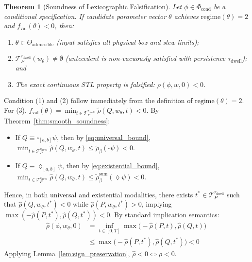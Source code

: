 \documentclass[journal]{IEEEtran}
\newtheorem{theorem}{Theorem}
\begin{document}
\begin{theorem}[Soundness of Lexicographic Falsification]
\label{thm:lexicographic_soundness}
Let $\phi \in \Phi_{\text{cond}}$ be a conditional specification. If candidate parameter vector $\theta$ achieves $\text{regime}(\theta) = 2$ and $f_{\text{val}}(\theta) < 0$, then:
\begin{enumerate}
    \item $\theta \in \Theta_{\text{admissible}}$ (input satisfies all physical box and slew limits);
    \item $\mathcal{T}_P^{\tau_{\text{dwell}}}(w_\theta) \neq \emptyset$ (antecedent is non-vacuously satisfied with persistence $\tau_{\text{dwell}}$); and
    \item The exact continuous STL property is falsified: $\rho(\phi, w, 0) < 0$.
\end{enumerate}
\end{theorem}
\begin{IEEEproof}
Condition (1) and (2) follow immediately from the definition of $\text{regime}(\theta) = 2$. For (3), $f_{\text{val}}(\theta) = \min_{t \in \mathcal{T}_P^{\tau_{\text{dwell}}}} \tilde{\rho}(Q, w_\theta, t) < 0$. 
By Theorem~\ref{thm:smooth_soundness}:
\begin{itemize}
    \item If $Q \equiv \square_{[a,b]} \psi$, then by \eqref{eq:universal_bound}, $\min_{t \in \mathcal{T}_P^{\tau_{\text{dwell}}}} \hat{\rho}(Q, w_\theta, t) \le \tilde{\rho}_\beta(\square \psi) < 0$.
    \item If $Q \equiv \lozenge_{[a,b]} \psi$, then by \eqref{eq:existential_bound}, $\min_{t \in \mathcal{T}_P^{\tau_{\text{dwell}}}} \hat{\rho}(Q, w_\theta, t) \le \tilde{\rho}_\beta^{\text{sum}}(\lozenge \psi) < 0$.
\end{itemize}
Hence, in both universal and existential modalities, there exists $t^* \in \mathcal{T}_P^{\tau_{\text{dwell}}}$ such that $\hat{\rho}(Q, w_\theta, t^*) < 0$ while $\hat{\rho}(P, w_\theta, t^*) > 0$, implying $\max(-\hat{\rho}(P, t^*), \hat{\rho}(Q, t^*)) < 0$. By standard implication semantics:
\begin{align*}
\hat{\rho}(\phi, w_\theta, 0) &= \inf_{t \in [0, T]} \max\big(-\hat{\rho}(P, t), \hat{\rho}(Q, t)\big) \\
&\le \max\big(-\hat{\rho}(P, t^*), \hat{\rho}(Q, t^*)\big) < 0
\end{align*}
Applying Lemma~\ref{lem:sign_preservation}, $\hat{\rho} < 0 \iff \rho < 0$.
\end{IEEEproof}
\end{document}
